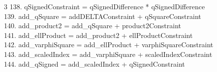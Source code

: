 \documentclass[10pt]{article}
\begin{document}
\begin{multicols}{3}
138. qSignedConstraint = qSignedDifference * qSignedDifference\\
139. add\_qSquare = addDELTAConstraint + qSquareConstraint\\
140. add\_product2 = add\_qSquare + product2Constraint\\
141. add\_ellProduct = add\_product2 + ellProductConstraint\\
142. add\_varphiSquare = add\_ellProduct + varphiSquareConstraint\\
143. add\_scaledIndex = add\_varphiSquare + scaledIndexConstraint\\
144. add\_qSigned = add\_scaledIndex + qSignedConstraint\\
\end{multicols}
\end{document}
